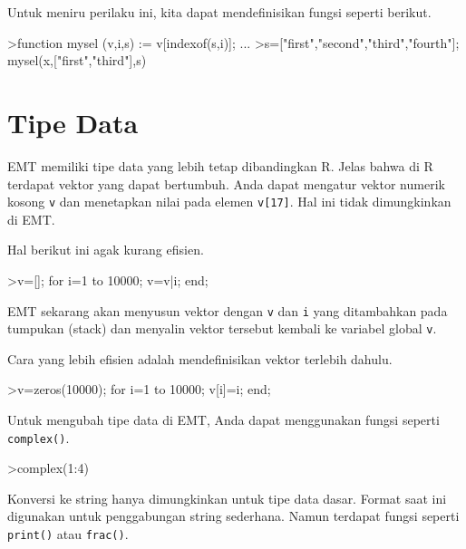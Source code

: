 \documentclass[a4paper,11pt,oneside,enabledeprecatedfontcommands]{scrbook}
\newenvironment{eulernotebook}{}{}
\newcommand{\eulerheading}[1]{\chapter{#1}}
\newenvironment{eulercomment}{\par\medskip\noindent}{\par\medskip}
\begin{document}
\begin{eulernotebook}
\begin{eulercomment}
			Untuk meniru perilaku ini, kita dapat mendefinisikan fungsi seperti berikut.
		\end{eulercomment}
		\begin{eulerprompt}
			>function mysel (v,i,s) := v[indexof(s,i)]; ...
			>s=["first","second","third","fourth"]; mysel(x,["first","third"],s)
		\end{eulerprompt}
		\begin{euleroutput}
			[10.4,  3.1]
		\end{euleroutput}
		
		\eulerheading{Tipe Data}
		\begin{eulercomment}
			EMT memiliki tipe data yang lebih tetap dibandingkan R. Jelas bahwa di R terdapat vektor yang dapat
			bertumbuh. Anda dapat mengatur vektor numerik kosong \texttt{v} dan menetapkan nilai pada elemen \texttt{v[17]}. Hal
			ini tidak dimungkinkan di EMT.
			
			Hal berikut ini agak kurang efisien.
		\end{eulercomment}
		\begin{eulerprompt}
			>v=[]; for i=1 to 10000; v=v|i; end;
		\end{eulerprompt}
		\begin{eulercomment}
			EMT sekarang akan menyusun vektor dengan \texttt{v} dan \texttt{i} yang ditambahkan pada tumpukan (stack) dan menyalin
			vektor tersebut kembali ke variabel global \texttt{v}.
			
			Cara yang lebih efisien adalah mendefinisikan vektor terlebih dahulu.
		\end{eulercomment}
		\begin{eulerprompt}
			>v=zeros(10000); for i=1 to 10000; v[i]=i; end;
		\end{eulerprompt}
		\begin{eulercomment}
			Untuk mengubah tipe data di EMT, Anda dapat menggunakan fungsi seperti \texttt{complex()}.
		\end{eulercomment}
		\begin{eulerprompt}
			>complex(1:4)
		\end{eulerprompt}
		\begin{euleroutput}
			[ 1+0i ,  2+0i ,  3+0i ,  4+0i  ]
		\end{euleroutput}
		\begin{eulercomment}
			Konversi ke string hanya dimungkinkan untuk tipe data dasar. Format saat ini digunakan untuk
			penggabungan string sederhana. Namun terdapat fungsi seperti \texttt{print()} atau \texttt{frac()}.
			

\end{eulercomment}
\end{eulernotebook}
\end{document}
